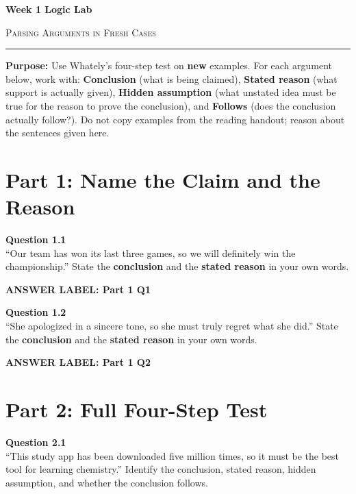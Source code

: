 \documentclass[12pt]{article}
\newcommand{\answerbox}[2]{%
\vspace{0.15em}
\noindent\textbf{#1}\par
\vspace{0.05em}
\noindent\fbox{%
\begin{minipage}[t][#2]{\dimexpr\textwidth-2\fboxsep-2\fboxrule}
\rule{\textwidth}{0pt}
\vspace{#2}
\end{minipage}
}\par
\vspace{0.25em}
}
\begin{document}
\begin{center}
{\LARGE\bfseries Week 1 Logic Lab}\par\vspace{0.05em}
{\large\scshape Parsing Arguments in Fresh Cases}\par\vspace{0.1em}
\rule{0.78\textwidth}{0.5pt}\par\vspace{0.15em}
\end{center}

\noindent\textbf{Purpose:} Use Whately's four-step test on \textbf{new} examples. For each argument below, work with: \textbf{Conclusion} (what is being claimed), \textbf{Stated reason} (what support is actually given), \textbf{Hidden assumption} (what unstated idea must be true for the reason to prove the conclusion), and \textbf{Follows} (does the conclusion actually follow?). Do not copy examples from the reading handout; reason about the sentences given here.

\vspace{0.3em}

\section*{Part 1: Name the Claim and the Reason}

\textbf{Question 1.1}\\[-0.15em]
``Our team has won its last three games, so we will definitely win the championship.'' State the \textbf{conclusion} and the \textbf{stated reason} in your own words.

\answerbox{ANSWER LABEL: Part 1 Q1}{1.65in}

\textbf{Question 1.2}\\[-0.15em]
``She apologized in a sincere tone, so she must truly regret what she did.'' State the \textbf{conclusion} and the \textbf{stated reason} in your own words.

\answerbox{ANSWER LABEL: Part 1 Q2}{1.65in}

\newpage

\section*{Part 2: Full Four-Step Test}

\textbf{Question 2.1}\\[-0.15em]
``This study app has been downloaded five million times, so it must be the best tool for learning chemistry.'' Identify the conclusion, stated reason, hidden assumption, and whether the conclusion follows.
\end{document}

